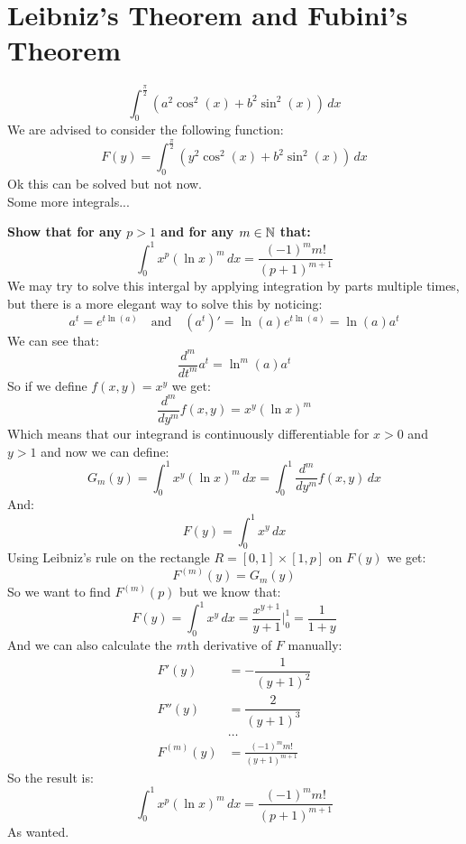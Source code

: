 \documentclass[11pt,a4paper]{article}
\begin{document}
	\newpage
	
	\section{Leibniz's Theorem and Fubini's Theorem}
	\[
		\int_{0}^{\frac{\pi}{2}}{(a^2\cos^2(x) + b^2\sin^2(x))\,dx}
	\]
	We are advised to consider the following function:
	\[
		F(y) = 
		\int_{0}^{\frac{\pi}{2}}{(y^2\cos^2(x) + b^2\sin^2(x))\,dx}
	\]
	Ok this can be solved but not now.\\
	
	Some more integrals...
	
	\newpage
	
	\textbf{Show that for any $p > 1$ and for any $m\in\mathbb{N}$ that:
	\[
		\int_{0}^{1}{x^p(\ln x)^m\,dx} = \frac{(-1)^m m!}{(p+1)^{m+1}}
	\]}
	We may try to solve this intergal by applying integration by parts
	multiple times, but there is a more elegant way to solve this by
	noticing:
	\[
		a^t = e^{t\ln(a)} 
		\quad\text{and}\quad
		(a^t)' = \ln(a) e^{t\ln(a)} = \ln(a) a^t
	\]
	We can see that:
	\[
		\frac{d^m}{dt^m}a^t = \ln^m(a) a^t
	\]
	So if we define $f(x,y) = x^y$ we get:
	\[
		\frac{d^m}{dy^m}f(x,y) = x^y (\ln x)^m
	\]
	Which means that our integrand is continuously differentiable for
	$x > 0$ and $y > 1$ and now we can define:
	\[
		G_m(y) = 
		\int_{0}^{1}{x^y(\ln x)^m\,dx} = 
		\int_{0}^{1}{\frac{d^m}{dy^m}f(x,y)\,dx}
	\]
	And:
	\[
		F(y) = \int_{0}^{1}{x^y\,dx}
	\]
	Using Leibniz's rule on the rectangle $R = [0,1]\times[1,p]$ on $F(y)$
	we get:
	\[
		F^{(m)}(y) = G_m(y)
	\]
	So we want to find $F^{(m)}(p)$ but we know that:
	\[
		F(y) = \int_{0}^{1}{x^y\,dx} = \frac{x^{y+1}}{y+1}\biggr\vert_0^1 =
		\frac{1}{1+y}
	\]
	And we can also calculate the $m$th derivative of $F$ manually:
	\begin{align*}
		F'(y) &= -\dfrac{1}{\left(y+1\right)^2} \\
		F''(y) &= \dfrac{2}{\left(y+1\right)^3} \\
		&\dots \\
		F^{(m)}(y) &= \frac{(-1)^m m!}{(y+1)^{m+1}}
	\end{align*}
	So the result is:
	\[
		\int_{0}^{1}{x^p(\ln x)^m\,dx} = \frac{(-1)^m m!}{(p+1)^{m+1}}
	\]
	As wanted.
	
	\newpage
\end{document}
